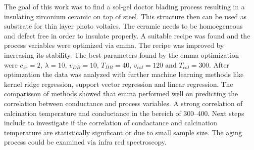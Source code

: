 The goal of this work was to find a sol-gel doctor blading process resulting in a insulating zirconium ceramic on top of steel.
This structure then can be used as substrate for thin layer photo voltaics. 
The ceramic needs to be homoegeneous and defect free in order to insulate properly.
A suitable recipe was found\cite{Hu2016} and the process variables were optimized via \gls{emma}. 
The recipe was improved by increasing its stability. 
The best parameters found by the emma optimization were 
$c_{zr}=2$, $\lambda=10$, $v_{DB}=10$, $T_{DB}=40$, $v_{cal}=120$ and $T_{cal}=300$.
After optimzation the data was analyzed with further machine learning methods like kernel ridge regression, support vector regression and linear regression. 
The comparisson of methods showed that \gls{emma} performed well on predicting the correlation between conductance and process variables. 
A strong correlation of calcination temperature and conductance in the bereich of 300--400\oc{}. 
Next steps include to investigate if the correlation of condactance and calcination temperature are statistically significant or due to small sample size. 
The aging process could be examined via infra red spectroscopy. 
\iffalse
was kann noch veraendert werden? 
humidity 
solution age
vdb and tdb on g and phd 
Tcal on g and phd 

Making of the solution for the sol-gel process:
For a single concentrated solution \ml{0.05} of \gls{zrpro} are added while stirring to \ml{4.95} of \gls{buoh} and stirred for \minutes{15}. 
\ml{0.013} (or one molar equvilent of Zr) of \gls{acac} is added to the stirring solution. 
After another \minutes{15} \ml{1} of acetic acid is added and stirred for \minutes{30} to stabilize the solution up to \h{24}. 

The concentration can be increased up to 5 times being stable for a minimum of \h{4}. 
The sol-gel process produces am homogeneous transparent crystalline zirconia oxide layer. 
homogeneity can be mainly controlled via blade velocity and temperature and layers can be stacked.

It should have been also verglichen with grid search with comparable size
but most time was used to find a vernuenfig base recipe and process

It is still very human 
Der process is - as it the case with all ML and most fitting processes - is very abhaengig von hyper parameters, 
In the current work population size, number of generations, and most importantly boundaries (grenzen). 
\fi
